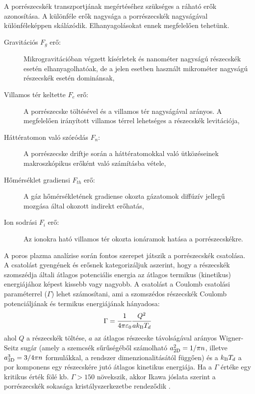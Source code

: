 	A porrészecskék transzportjának megértéséhez szükséges a ráható erők azonosítása.
	A különféle erők nagysága a porrészecskék nagyságá{\color{red}val} különféleképpen skálázódik. Elhanyagolásokat
	ennek megfelelően tehetünk.
	\begin{description}
		\item[Gravitációs $F_g$ erő:] Mikrogravitációban végzett kísérletek és nanométer nagyságú részecskék esetén
			elhanyagolhatóak, de a jelen esetben használt mikrométer nagyságú részecskék esetén dominánsak,
		\item[Villamos tér keltette $F_e$ erő:] A porrészecske töltésével és a villamos tér nagyságával
			arányos. A megfelelően irányított villamos térrel lehetséges a részecskék levitációja,  
		\item[Háttératomon való szóródás $F_n$:] A porrészecske driftje során a háttératomokkal való
			{\color{red} ütközéseinek} makroszkópikus erőként való számításba vétele,
		\item[Hőmérséklet gradiensi $F_{th}$ erő:] A gáz hőmérsékletének gradiense okozta
			gázatomok diffúzív jellegű mozgása által okozott indirekt erőhatás,
		\item[Ion sodrási $F_i$ erő:] Az ionokra ható villamos tér okozta {\color{red}ionáramok} hatása a
			porrészecskékre.
	\end{description}
	A poros plazma analízise során fontos szerepet játszik a porrészecskék csatolása.
	A csatolást gyengének és erősnek kategorizáljuk aszerint, hogy a részecskék szomszédja általi
	átlagos potenciális energia az átlagos termikus (kinetikus) energiájához képest kissebb vagy
	nagyobb.
	A csatolást a Coulomb csatolási paraméterrel ($\Gamma$) lehet számosítani, ami a szomszédos
	részecskék Coulomb potenciáljának és termikus energiájának {\color{red}hányadosa}:
	\begin{equation}
		\Gamma = \cfrac{1}{4\pi\varepsilon_0}
                \cfrac{Q^2}{ak_{\rm B}T_d} 
	\end{equation}
	ahol $Q$ a részecskék töltése, $a$ az átlagos részecske
        távolság{\color{red}ával arányos Wigner-Seitz sugár (amely a
          szemcsék sűrűségéből számolható $a^2_{\rm 2D}=1/\pi n$,
          illetve $a^3_{\rm 3D}=3/4\pi n$ formulákkal, a rendszer
          dimenzionalitásától függően)} és a $k_{\rm B}T_d$ a por
        {\color{red} komponens egy részecskére jutó átlagos kinetikus energiája}.
	Ha a $\Gamma$ értéke egy kritikus érték fölé {\color{red}kb.} $\Gamma > 150$ növekszik, akkor
	Ikawa jóslata szerint a porrészecskék {\color{red}sokasága}
        kristályszerkezetbe rendeződik \cite{Ikawa} .
	
